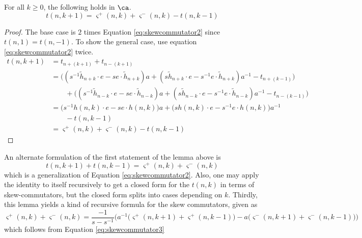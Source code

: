 \begin{lemma} \label{lemma:skewcommutatordecomp}
For all $k \geq 0$, the following holds in $\ca$.
\[
t(n, k+1) =  \varsigma^+ (n, k) + \varsigma^- (n, k) - t(n, k-1)
\]
\end{lemma}
\begin{proof}
The base case is $2$ times Equation \ref{eq:skewcommutator2} since $t(n, 1) = t(n, -1)$. To show the general case, use equation \eqref{eq:skewcommutator2} twice.
\begin{align*}
t(n, k+1)
&= t_{n+(k+1)} + t_{n-(k+1)} \\
&= \big( ( s^{-1} \tilde{h}_{n+k} \cdot e - s e \cdot \tilde{h}_{n+k} ) a + ( s \tilde{h}_{n+k} \cdot e - s^{-1} e \cdot \tilde{h}_{n+k} ) a^{-1} - t_{n+(k-1)} \big) \\
&\qquad + \big( ( s^{-1} \tilde{h}_{n-k} \cdot e - s e \cdot \tilde{h}_{n-k} ) a + ( s \tilde{h}_{n-k} \cdot e - s^{-1} e \cdot \tilde{h}_{n-k} ) a^{-1} - t_{n-(k-1)} \big) \\
&= \big( s^{-1} h(n, k) \cdot e - s e \cdot h(n, k) \big) a + \big( s h(n, k) \cdot e - s^{-1} e \cdot h(n, k) \big) a^{-1} \\
&\qquad - t(n, k-1) \\
&= \varsigma^+ (n, k) + \varsigma^- (n, k) - t(n, k-1)
\end{align*}
\end{proof}

\begin{remark}
An alternate formulation of the first statement of the lemma above is
\begin{equation} \label{eq:skewcommutator4}
t(n, k+1) + t(n, k-1) = \varsigma^+ (n, k) + \varsigma^- (n, k)
\end{equation}
which is a generalization of Equation \eqref{eq:skewcommutator2}. Also, one may apply the identity to itself recursively to get a closed form for the $t(n,k)$ in terms of skew-commutators, but the closed form splits into cases depending on $k$. Thirdly, this lemma yields a kind of recursive formula for the skew commutators, given as
\begin{equation} \label{eq:skewcommutator5}
\varsigma^+ (n, k) + \varsigma^- (n, k) = \frac{-1}{s-s^{-1}} \Big( a^{-1} \big( \varsigma^+(n, k+1) + \varsigma^+(n, k-1) \big) - a \big( \varsigma^-(n, k+1) + \varsigma^-(n, k-1) \big) \Big)
\end{equation}
which follows from Equation \eqref{eq:skewcommutator3}
\end{remark}

